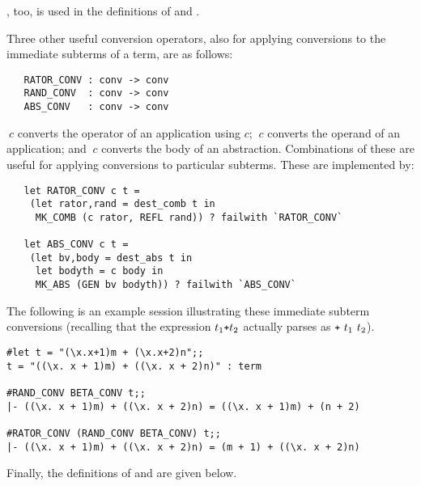 \noindent {}, too, is used in the definitions of
 and .

Three other useful conversion operators, also for applying conversions
to the immediate subterms of a term, are as follows:


\begin{boxed}
\begin{verbatim}
   RATOR_CONV : conv -> conv
   RAND_CONV  : conv -> conv
   ABS_CONV   : conv -> conv
\end{verbatim}\end{boxed}

\noindent {}$\ c$ converts the operator of an application using
$c$; $\ c$ converts the operand of an application; and
$\ c$ converts the body of an abstraction. Combinations
of these are useful for applying conversions to particular subterms.
These are implemented by:

\begin{hol}\begin{verbatim}
   let RATOR_CONV c t =
    (let rator,rand = dest_comb t in
     MK_COMB (c rator, REFL rand)) ? failwith `RATOR_CONV`

   let ABS_CONV c t =
    (let bv,body = dest_abs t in
     let bodyth = c body in
     MK_ABS (GEN bv bodyth)) ? failwith `ABS_CONV`
\end{verbatim}\end{hol}

\noindent The following 
is an example session illustrating these immediate subterm conversions
(recalling that the expression $t_1\ml{+}t_2$ 
actually parses as $\ml{+}\ t_1\ t_2$).

\setcounter{sessioncount}{1}
\begin{session}\begin{verbatim}
#let t = "(\x.x+1)m + (\x.x+2)n";;
t = "((\x. x + 1)m) + ((\x. x + 2)n)" : term

#RAND_CONV BETA_CONV t;;
|- ((\x. x + 1)m) + ((\x. x + 2)n) = ((\x. x + 1)m) + (n + 2)

#RATOR_CONV (RAND_CONV BETA_CONV) t;;
|- ((\x. x + 1)m) + ((\x. x + 2)n) = (m + 1) + ((\x. x + 2)n)
\end{verbatim}\end{session}

\noindent Finally, the definitions of  and
 are given below.


